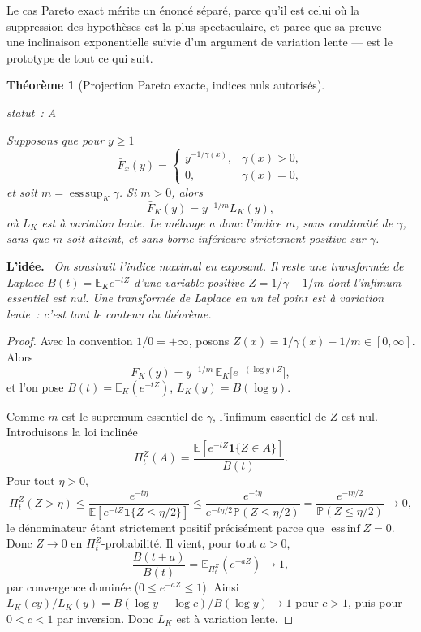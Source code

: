 \documentclass[11pt]{article}
\theoremstyle{plain}
\newtheorem{theoreme}{Théorème}[section]
\theoremstyle{definition}
\theoremstyle{remark}
\DeclareMathOperator*{\esssup}{ess\,sup}
\DeclareMathOperator*{\essinf}{ess\,inf}
\newcommand{\Pp}{\mathbb P}
\newcommand{\E}{\mathbb E}
\newcommand{\1}{\mathbf 1}
\newcommand{\statut}[1]{%
  \nopagebreak\par\nopagebreak
  \hfill{\normalfont\footnotesize\textcolor{gris}{statut~: #1}}%
  \par\nopagebreak\vspace{-2pt}}
\newenvironment{idee}
  {\par\medskip\noindent\textcolor{bleu}{\textbf{L'idée.}}\ \itshape}
  {\par\medskip}
\begin{document}
Le cas Pareto exact mérite un énoncé séparé, parce qu'il est celui où la
suppression des hypothèses est la plus spectaculaire, et parce que sa
preuve --- une inclinaison exponentielle suivie d'un argument de
variation lente --- est le prototype de tout ce qui suit.

\begin{theoreme}[Projection Pareto exacte, indices nuls autorisés]
\label{thm:pareto}
\statut{A}
Supposons que pour $y\ge1$
\[
 \bar F_x(y)=
 \begin{cases}
  y^{-1/\gamma(x)}, & \gamma(x)>0,\\
  0, & \gamma(x)=0,
 \end{cases}
\]
et soit $m=\esssup_K\gamma$. Si $m>0$, alors
\[
 \bar F_K(y)=y^{-1/m}L_K(y),
\]
où $L_K$ est à variation lente. Le mélange a donc l'indice $m$, sans
continuité de $\gamma$, sans que $m$ soit atteint, et sans borne
inférieure strictement positive sur $\gamma$.
\end{theoreme}

\begin{idee}
On soustrait l'indice maximal en exposant. Il reste une transformée de
Laplace $B(t)=\E_K e^{-tZ}$ d'une variable positive $Z=1/\gamma-1/m$
dont l'\emph{infimum essentiel est nul}. Une transformée de Laplace en un
tel point est à variation lente~: c'est tout le contenu du théorème.
\end{idee}

\begin{proof}
Avec la convention $1/0=+\infty$, posons
$Z(x)=1/\gamma(x)-1/m\in[0,\infty]$. Alors
\[
 \bar F_K(y)=y^{-1/m}\,\E_K\bigl[e^{-(\log y)Z}\bigr],
\]
et l'on pose $B(t)=\E_K(e^{-tZ})$, $L_K(y)=B(\log y)$.

Comme $m$ est le supremum essentiel de $\gamma$, l'infimum essentiel de
$Z$ est nul. Introduisons la loi inclinée
\[
 \Pi^Z_t(A)=\frac{\E[e^{-tZ}\1\{Z\in A\}]}{B(t)} .
\]
Pour tout $\eta>0$,
\[
 \Pi^Z_t(Z>\eta)
 \le\frac{e^{-t\eta}}{\E[e^{-tZ}\1\{Z\le\eta/2\}]}
 \le\frac{e^{-t\eta}}{e^{-t\eta/2}\Pp(Z\le\eta/2)}
 =\frac{e^{-t\eta/2}}{\Pp(Z\le\eta/2)}\longrightarrow0,
\]
le dénominateur étant strictement positif précisément parce que
$\essinf Z=0$. Donc $Z\to0$ en $\Pi^Z_t$-probabilité. Il vient, pour
tout $a>0$,
\[
 \frac{B(t+a)}{B(t)}=\E_{\Pi^Z_t}(e^{-aZ})\longrightarrow1,
\]
par convergence dominée ($0\le e^{-aZ}\le1$). Ainsi
$L_K(cy)/L_K(y)=B(\log y+\log c)/B(\log y)\to1$ pour $c>1$, puis pour
$0<c<1$ par inversion. Donc $L_K$ est à variation lente.
\end{proof}
\end{document}
